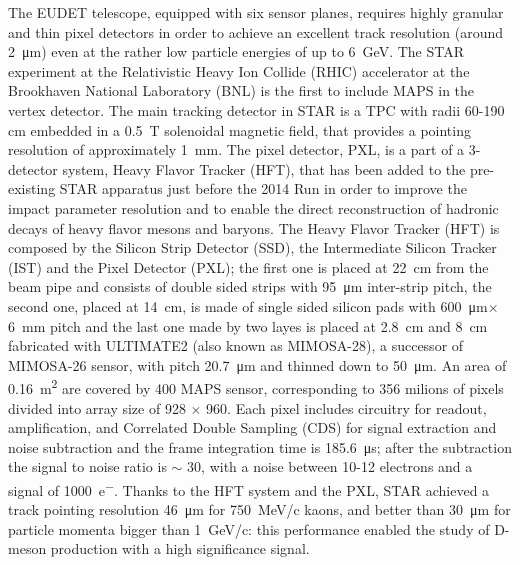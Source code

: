        The EUDET telescope, equipped with six sensor planes, requires highly granular and thin pixel detectors in order to achieve an excellent track resolution (around \SI{2}{\um}) even at the rather low particle energies of up to \SI{6}{GeV}.
        The STAR experiment at the Relativistic Heavy Ion Collide (RHIC) accelerator at the Brookhaven National Laboratory (BNL) is the first to include MAPS in the vertex detector\cite{STAR}.
        The main tracking detector in STAR is a TPC with radii 60-190 cm  embedded in a \SI{0.5}{T} solenoidal magnetic field, that provides a pointing resolution of approximately \SI{1}{mm}. 
        The pixel detector, PXL, is a part of a 3-detector system, Heavy Flavor Tracker (HFT), that has been added to the pre-existing STAR apparatus just before the 2014 Run in order to improve the impact parameter resolution and to enable the direct reconstruction of hadronic decays of heavy flavor mesons and baryons.     
        The Heavy Flavor Tracker (HFT) is composed by the Silicon Strip Detector (SSD), the Intermediate Silicon Tracker (IST) and the Pixel Detector (PXL); the first one is placed at \SI{22}{cm} from the beam pipe and consists of double sided strips with \SI{95}{\um} inter-strip pitch, the second one, placed at \SI{14}{cm}, is made of single sided silicon pads with \SI{600}{\um}$\times$\SI{6}{mm} pitch and the last one made by two layes is placed at \SI{2.8}{cm} and \SI{8}{cm} fabricated with ULTIMATE2 (also known as MIMOSA-28), a successor of MIMOSA-26 sensor, with pitch \SI{20.7}{\um} and thinned down to \SI{50}{\um}.
        An area of \SI{0.16}{m\squared} are covered by 400 MAPS sensor, corresponding to 356 milions of pixels divided into array size of 928 $\times$ 960.
        Each pixel includes circuitry for readout, amplification, and Correlated Double Sampling (CDS) for signal extraction and noise subtraction and the frame integration time is \SI{185.6}{\us}; after the subtraction the signal to noise ratio is $\sim$ 30, with a noise between 10-12 electrons and a signal of \SI{1000}{e^-}.
        Thanks to the HFT system and the PXL, STAR achieved a track pointing resolution \SI{46}{\um} for \SI{750}{MeV/c} kaons, and better than \SI{30}{\um} for particle momenta bigger than \SI{1}{GeV/c}: this performance enabled the study of D-meson production with a high significance signal.
